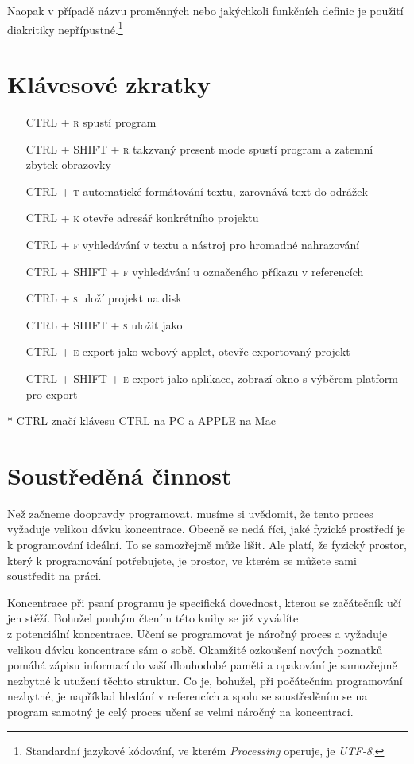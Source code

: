 \documentclass[10pt,twoside=true,open=right,cleardoublepage=empty,chapterprefix=true]{scrbook}
\newcommand{\oddil}[1]{\section{#1}\index{#1}\label{#1}}
\newcommand{\klavesy}[1]{\textsc{#1}}
\begin{document}
Naopak v případě názvu proměnných nebo jakýchkoli funkčních definic je použití diakritiky nepřípustné.\footnote{Standardní jazykové kódování, ve kterém {\em Processing} operuje, je {\em UTF-8}.}


\oddil{Klávesové zkratky}

\begin{itemize}
\item[\klavesy{CTRL + r}]  spustí program
\item[\klavesy{CTRL + SHIFT + r}] takzvaný present mode spustí program a zatemní zbytek obrazovky
\item[\klavesy{CTRL + t}] automatické formátování textu, zarovnává text do odrážek
\item[\klavesy{CTRL + k}] otevře adresář konkrétního projektu
\item[\klavesy{CTRL + f}] vyhledávání v textu a nástroj pro hromadné nahrazování
\item[\klavesy{CTRL + SHIFT + f}] vyhledávání u označeného příkazu v referencích
\item[\klavesy{CTRL + s}] uloží projekt na disk
\item[\klavesy{CTRL + SHIFT + s}] uložit jako

\item[\klavesy{CTRL + e}] export jako webový applet, otevře exportovaný projekt
\item[\klavesy{CTRL + SHIFT + e}] export jako aplikace, zobrazí okno s výběrem platform pro export

\end{itemize}

* \klavesy{CTRL} značí klávesu \klavesy{CTRL} na PC a \klavesy{APPLE} na Mac



\oddil{Soustředěná činnost}

Než začneme doopravdy programovat, musíme si uvědomit, že tento proces vyžaduje velikou dávku koncentrace. Obecně se nedá říci, jaké fyzické prostředí je k programování ideální. To se samozřejmě může lišit. Ale platí, že fyzický prostor, který k programování potřebujete, je prostor, ve kterém se můžete sami soustředit na práci.

Koncentrace při psaní programu je specifická dovednost, kterou se začátečník učí jen stěží. Bohužel pouhým čtením této knihy se již vyvádíte \\z potenciální koncentrace. Učení se programovat je náročný proces a vyžaduje velikou dávku koncentrace sám o sobě. Okamžité ozkoušení nových poznatků pomáhá zápisu informací do vaší dlouhodobé paměti a opakování je samozřejmě nezbytné k utužení těchto struktur. Co je, bohužel, při počátečním programování nezbytné, je například hledání v referencích a spolu se soustředěním se na program samotný je celý proces učení se velmi náročný na koncentraci.
\end{document}

